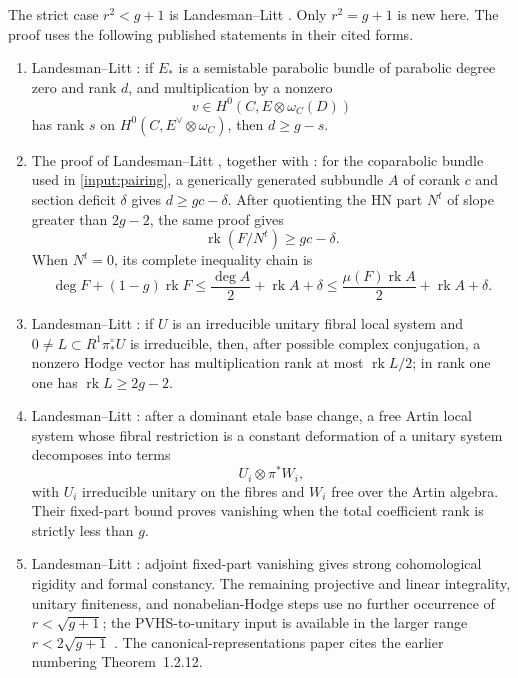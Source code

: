 \documentclass[11pt]{article}
\theoremstyle{definition}
\newcommand{\rk}{\operatorname{rk}}
\begin{document}
The strict case $r^2<g+1$ is Landesman--Litt
\cite[Theorem~1.2.1]{LLCan}.  Only $r^2=g+1$ is new here.  The proof uses the
following published statements in their cited forms.

\begin{enumerate}[label=\textup{(I\arabic*)},leftmargin=2.9em]
\item\label{input:pairing}
Landesman--Litt \cite[Proposition~5.2.3]{LLCan}: if $E_*$ is a semistable
parabolic bundle of parabolic degree zero and rank $d$, and multiplication
by a nonzero
\[
 v\in H^0(C,E\otimes\omega_C(D))
\]
has rank $s$ on $H^0(C,E^\vee\otimes\omega_C)$, then $d\ge g-s$.

\item\label{input:hn}
The proof of Landesman--Litt \cite[Proposition~6.3.6]{LLGeo}, together with
\cite[Lemma~6.2.3]{LLGeo}: for the coparabolic bundle used in
\cref{input:pairing}, a generically generated subbundle $A$ of corank $c$
and section deficit $\delta$ gives $d\ge gc-\delta$.  After quotienting the
HN part $N^t$ of slope greater than $2g-2$, the same proof gives
\[
 \rk(F/N^t)\ge gc-\delta.
\]
When $N^t=0$, its complete inequality chain is
\begin{equation}
 \deg F+(1-g)\rk F
 \le \frac{\deg A}{2}+\rk A+\delta
 \le \frac{\mu(F)\rk A}{2}+\rk A+\delta.
 \label{eq:hn-chain}
\end{equation}

\item\label{input:hodge}
Landesman--Litt \cite[Lemma~6.1.1 and Theorem~1.7.1]{LLCan}: if $U$ is an
irreducible unitary fibral local system and
$0\ne L\subset R^1\pi_*^\circ U$ is irreducible, then, after possible
complex conjugation, a nonzero Hodge vector has multiplication rank at most
$\rk L/2$; in rank one one has $\rk L\ge2g-2$.

\item\label{input:artin}
Landesman--Litt \cite[Lemma~2.4.2 and Theorem~6.2.1]{LLCan}: after a
dominant etale base change, a free Artin local system whose fibral
restriction is a constant deformation of a unitary system decomposes into
terms
\[
 U_i\otimes\pi^*W_i,
\]
with $U_i$ irreducible unitary on the fibres and $W_i$ free over the Artin
algebra.  Their fixed-part bound proves vanishing when the total coefficient
rank is strictly less than $g$.

\item\label{input:pipeline}
Landesman--Litt \cite[Sections~8.2--8.5]{LLCan}: adjoint fixed-part
vanishing gives strong cohomological rigidity and formal constancy.  The
remaining projective and linear integrality, unitary finiteness, and
nonabelian-Hodge steps use no further occurrence of
$r<\sqrt{g+1}$; the PVHS-to-unitary input is available in the larger range
$r<2\sqrt{g+1}$ \cite[Theorem~1.2.13]{LLGeo}.  The canonical-representations
paper cites the earlier numbering Theorem~1.2.12.


\end{enumerate}
\end{document}
